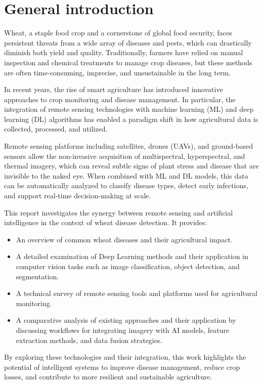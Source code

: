 \chapter*{General introduction}
\label{chap.intro}

Wheat, a staple food crop and a cornerstone of global food security, faces persistent threats from a wide array of diseases and pests, which can drastically diminish both yield and quality. Traditionally, farmers have relied on manual inspection and chemical treatments to manage crop diseases, but these methods are often time-consuming, imprecise, and unsustainable in the long term.

In recent years, the rise of smart agriculture has introduced innovative approaches to crop monitoring and disease management. In particular, the integration of remote sensing technologies with machine learning (ML) and deep learning (DL) algorithms has enabled a paradigm shift in how agricultural data is collected, processed, and utilized.

Remote sensing platforms including satellites, drones (UAVs), and ground-based sensors allow the non-invasive acquisition of multispectral, hyperspectral, and thermal imagery, which can reveal subtle signs of plant stress and disease that are invisible to the naked eye. When combined with ML and DL models, this data can be automatically analyzed to classify disease types, detect early infections, and support real-time decision-making at scale.

This report investigates the synergy between remote sensing and artificial intelligence in the context of wheat disease detection. It provides:


\begin{itemize}
    \item An overview of common wheat diseases and their agricultural impact.
    \item A detailed examination of Deep Learning methods and their application in computer vision tasks such as image classification, object detection, and segmentation.
    \item A technical survey of remote sensing tools and platforms used for agricultural monitoring.
    \item A comparative analysis of existing approaches and their application by discussing workflows for integrating imagery with AI models, feature extraction methods, and data fusion strategies.
  \end{itemize}
  
By exploring these technologies and their integration, this work highlights the potential of intelligent systems to improve disease management, reduce crop losses, and contribute to more resilient and sustainable agriculture.
